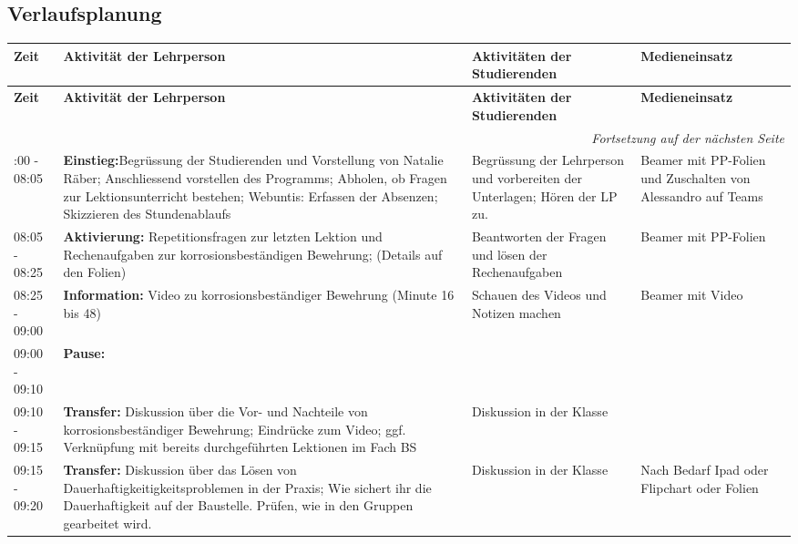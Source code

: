\documentclass[
11pt,
captions=tableheading,
headsepline,
footsepline, 
captions=tableheading,
parskip=half-,
]{scrartcl}
\begin{document}
\begin{landscape}
\subsection{Verlaufsplanung}
\begin{longtable}{@{}l|p{9cm}p{7.5cm}p{3.5cm}@{}}
    \toprule
    \textbf{Zeit} & \textbf{Aktivität der Lehrperson} & \textbf{Aktivitäten der Studierenden} & \textbf{Medieneinsatz} \\
    \midrule
    \endfirsthead
    \toprule
    \textbf{Zeit} & \textbf{Aktivität der Lehrperson} & \textbf{Aktivitäten der Studierenden} & \textbf{Medieneinsatz} \\
    \midrule
    \endhead
    \midrule
    \multicolumn{4}{r}{\textit{Fortsetzung auf der nächsten Seite}} \\
    \midrule
    \endfoot
    \bottomrule
    \endlastfoot
    \midrule
    08:00 - 08:05 & \textbf{Einstieg:}Begrüssung der Studierenden und Vorstellung von Natalie Räber; Anschliessend vorstellen des Programms; Abholen, ob Fragen zur Lektionsunterricht bestehen; Webuntis: Erfassen der Absenzen; Skizzieren des Stundenablaufs & Begrüssung der Lehrperson und vorbereiten der Unterlagen; Hören der LP zu. & Beamer mit PP-Folien und Zuschalten von Alessandro auf Teams\\
    \midrule
    08:05 - 08:25 & \textbf{Aktivierung:} Repetitionsfragen zur letzten Lektion und Rechenaufgaben zur korrosionsbeständigen Bewehrung; (Details auf den Folien) & Beantworten der Fragen und lösen der Rechenaufgaben  & Beamer mit PP-Folien\\
    \midrule
    08:25 - 09:00 & \textbf{Information:} Video zu korrosionsbeständiger Bewehrung (Minute 16 bis 48) & Schauen des Videos und Notizen machen & Beamer mit Video\\
    \midrule
    09:00 - 09:10 & \textbf{Pause:} {} & {}\\
    \midrule
    09:10 - 09:15 & \textbf{Transfer:} Diskussion über die Vor- und Nachteile von korrosionsbeständiger Bewehrung; Eindrücke zum Video; ggf. Verknüpfung mit bereits durchgeführten Lektionen im Fach BS & Diskussion in der Klasse & {}\\
    \midrule
    09:15 - 09:20 & \textbf{Transfer:} Diskussion über das Lösen von Dauerhaftigkeitigkeitsproblemen in der Praxis; Wie sichert ihr die Dauerhaftigkeit auf der Baustelle. Prüfen, wie in den Gruppen gearbeitet wird. & Diskussion in der Klasse & Nach Bedarf Ipad oder Flipchart oder Folien \\

\end{longtable}
\end{landscape}
\end{document}
